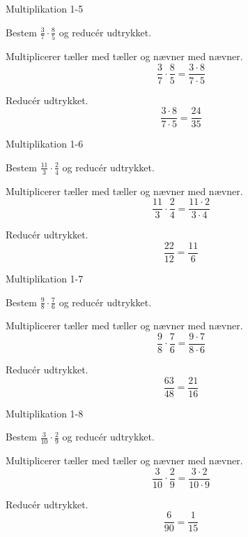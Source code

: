\documentclass{article}
\begin{document}
\newpage

\begin{exercise}{Multiplikation 1-5}

Bestem $\frac{3}{7} \cdot \frac{8}{5}$ og reducér udtrykket.


\hint

Multiplicerer tæller med tæller og nævner med nævner.
\[
\frac{3}{7} \cdot \frac{8}{5} = \frac{3 \cdot 8}{7 \cdot 5}
\]

\hint

Reducér udtrykket.
\[
\frac{3 \cdot 8}{7 \cdot 5} = \frac{24}{35}
\]

\end{exercise}

\newpage

\begin{exercise}{Multiplikation 1-6}

Bestem $\frac{11}{3} \cdot \frac{2}{4}$ og reducér udtrykket.


\hint

Multiplicerer tæller med tæller og nævner med nævner.
\[
\frac{11}{3} \cdot \frac{2}{4}= \frac{11 \cdot 2}{3 \cdot 4}
\]

\hint

Reducér udtrykket.
\[
\frac{22}{12} = \frac{11}{6}
\]

\end{exercise}

\newpage

\begin{exercise}{Multiplikation 1-7}

Bestem $\frac{9}{8} \cdot \frac{7}{6}$ og reducér udtrykket.


\hint

Multiplicerer tæller med tæller og nævner med nævner.
\[
\frac{9}{8} \cdot \frac{7}{6} = \frac{9 \cdot 7}{8 \cdot 6}
\]

\hint

Reducér udtrykket.
\[
\frac{63}{48} = \frac{21}{16}
\]

\end{exercise}

\newpage

\begin{exercise}{Multiplikation 1-8}

Bestem $\frac{3}{10} \cdot \frac{2}{9}$ og reducér udtrykket.


\hint

Multiplicerer tæller med tæller og nævner med nævner.
\[
\frac{3}{10} \cdot \frac{2}{9} = \frac{3 \cdot 2}{10 \cdot 9}
\]

\hint

Reducér udtrykket.
\[
\frac{6}{90} = \frac{1}{15}
\]

\end{exercise}
\end{document}
